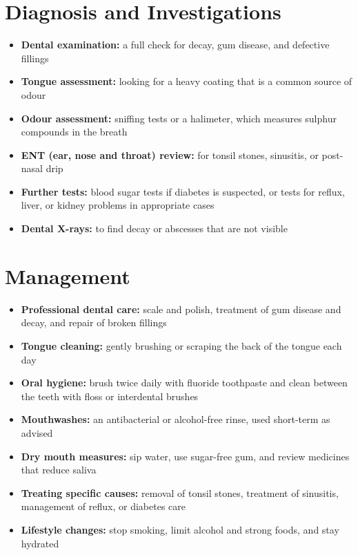 \section*{Diagnosis and Investigations}
\begin{itemize}
    \item \textbf{Dental examination:} a full check for decay, gum disease, and defective fillings
    \item \textbf{Tongue assessment:} looking for a heavy coating that is a common source of odour
    \item \textbf{Odour assessment:} sniffing tests or a halimeter, which measures sulphur compounds in the breath
    \item \textbf{ENT (ear, nose and throat) review:} for tonsil stones, sinusitis, or post-nasal drip
    \item \textbf{Further tests:} blood sugar tests if diabetes is suspected, or tests for reflux, liver, or kidney problems in appropriate cases
    \item \textbf{Dental X-rays:} to find decay or abscesses that are not visible
\end{itemize}

\section*{Management}
\begin{itemize}
    \item \textbf{Professional dental care:} scale and polish, treatment of gum disease and decay, and repair of broken fillings
    \item \textbf{Tongue cleaning:} gently brushing or scraping the back of the tongue each day
    \item \textbf{Oral hygiene:} brush twice daily with fluoride toothpaste and clean between the teeth with floss or interdental brushes
    \item \textbf{Mouthwashes:} an antibacterial or alcohol-free rinse, used short-term as advised
    \item \textbf{Dry mouth measures:} sip water, use sugar-free gum, and review medicines that reduce saliva
    \item \textbf{Treating specific causes:} removal of tonsil stones, treatment of sinusitis, management of reflux, or diabetes care
    \item \textbf{Lifestyle changes:} stop smoking, limit alcohol and strong foods, and stay hydrated
\end{itemize}

